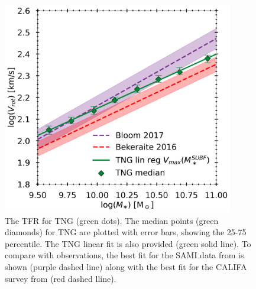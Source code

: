 \begin{figure}
    \centering
    \includegraphics[width=0.9\textwidth]{images/TFR.png}
    \caption{The TFR for TNG (green dots). The median points (green diamonds) for TNG are plotted with error bars, showing the 25-75 percentile. The TNG linear fit is also provided (green solid line). To compare with observations, the best fit for the SAMI data from \textcite{Bloom2017} is shown (purple dashed line) along with the best fit for the CALIFA survey from \textcite{Bekerait2016} (red dashed lline).}
    \label{TFR}
\end{figure}


